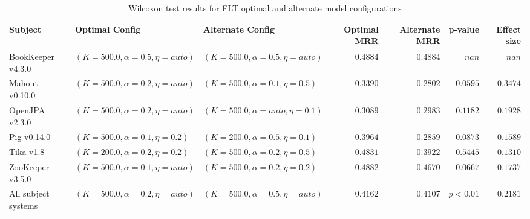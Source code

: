 
\begin{table}
\begin{spacing}{1.2}
\centering
\caption{Wilcoxon test results for FLT optimal and alternate model configurations}
\label{table:combo-flt-model-sweep-wilcox}
\begin{tabular}{lllrrrr}
\toprule
                      Subject &                      Optimal Config &                    Alternate Config & Optimal MRR & Alternate MRR &  p-value & Effect size \\
\midrule
            BookKeeper v4.3.0 &  $(K=500.0, \alpha=0.5, \eta=auto)$ &  $(K=500.0, \alpha=0.5, \eta=auto)$ &    $0.4884$ &      $0.4884$ &    $nan$ &       $nan$ \\
               Mahout v0.10.0 &  $(K=500.0, \alpha=0.2, \eta=auto)$ &   $(K=500.0, \alpha=0.1, \eta=0.5)$ &    $0.3390$ &      $0.2802$ & $0.0595$ &    $0.3474$ \\
               OpenJPA v2.3.0 &  $(K=500.0, \alpha=0.2, \eta=auto)$ &  $(K=500.0, \alpha=auto, \eta=0.1)$ &    $0.3089$ &      $0.2983$ & $0.1182$ &    $0.1928$ \\
                  Pig v0.14.0 &   $(K=500.0, \alpha=0.1, \eta=0.2)$ &   $(K=200.0, \alpha=0.5, \eta=0.1)$ &    $0.3964$ &      $0.2859$ & $0.0873$ &    $0.1589$ \\
                    Tika v1.8 &   $(K=200.0, \alpha=0.2, \eta=0.2)$ &   $(K=500.0, \alpha=0.2, \eta=0.5)$ &    $0.4831$ &      $0.3922$ & $0.5445$ &    $0.1310$ \\
             ZooKeeper v3.5.0 &  $(K=500.0, \alpha=0.1, \eta=auto)$ &   $(K=500.0, \alpha=0.2, \eta=0.2)$ &    $0.4882$ &      $0.4670$ & $0.0667$ &    $0.1737$ \\
 \midrule
All subject systems &  $(K=500.0, \alpha=0.2, \eta=auto)$ &  $(K=500.0, \alpha=0.5, \eta=auto)$ &    $0.4162$ &      $0.4107$ & $p<0.01$ &    $0.2181$ \\
\bottomrule
\end{tabular}

\end{spacing}
\end{table}

